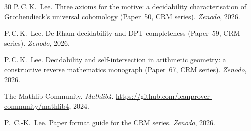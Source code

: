 \documentclass[11pt]{article}
\theoremstyle{plain}
\theoremstyle{definition}
\theoremstyle{remark}
\begin{document}
\begin{thebibliography}{30}
P.\,C.\,K.~Lee.
\newblock Three axioms for the motive: a decidability characterisation
of Grothendieck's universal cohomology
(Paper~50, CRM series).
\newblock \textit{Zenodo}, 2026.

P.\,C.\,K.~Lee.
\newblock De Rham decidability and DPT completeness
(Paper~59, CRM series).
\newblock \textit{Zenodo}, 2026.

P.\,C.\,K.~Lee.
\newblock Decidability and self-intersection in arithmetic geometry:
a constructive reverse mathematics monograph
(Paper~67, CRM series).
\newblock \textit{Zenodo}, 2026.

The Mathlib Community.
\newblock \textit{Mathlib4}.
\newblock \url{https://github.com/leanprover-community/mathlib4}, 2024.

P.~C.-K.~Lee.
\newblock Paper format guide for the CRM series.
\newblock \textit{Zenodo}, 2026.

\end{thebibliography}
\end{document}
